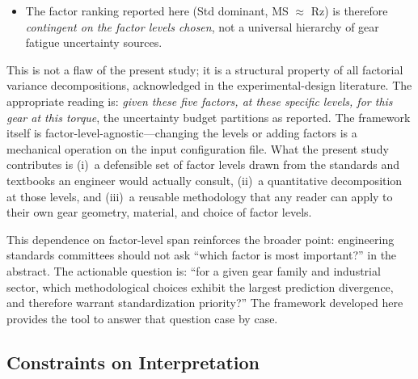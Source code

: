 \documentclass[twocolumn,12pt,a4paper]{article}
\begin{document}
\begin{itemize}
  \item The factor ranking reported here (Std dominant,
        MS $\approx$ Rz) is therefore \emph{contingent on the factor
        levels chosen}, not a universal hierarchy of gear fatigue
        uncertainty sources.
\end{itemize}

This is not a flaw of the present study; it is a structural property of
all factorial variance decompositions, acknowledged in the
experimental-design literature. The appropriate reading is: \emph{given
these five factors, at these specific levels, for this gear at this
torque}, the uncertainty budget partitions as reported. The framework
itself is factor-level-agnostic---changing the levels or adding factors
is a mechanical operation on the input configuration file. What the
present study contributes is (i)~a defensible set of factor levels
drawn from the standards and textbooks an engineer would actually
consult, (ii)~a quantitative decomposition at those levels, and
(iii)~a reusable methodology that any reader can apply to their own
gear geometry, material, and choice of factor levels.

This dependence on factor-level span reinforces the broader point:
engineering standards committees should not ask ``which factor is most
important?'' in the abstract. The actionable question is: ``for a given
gear family and industrial sector, which methodological choices exhibit
the largest prediction divergence, and therefore warrant
standardization priority?'' The framework developed here provides the
tool to answer that question case by case.

\subsection{Constraints on Interpretation}
\label{sec:constraints}
\end{document}
